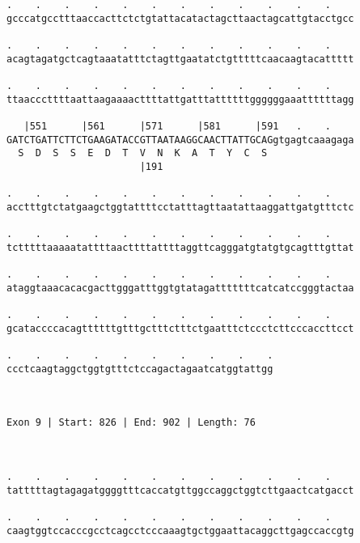\documentclass{article}
\begin{document}
\begin{Verbatim}
.    .    .    .    .    .    .    .    .    .    .    .    
gcccatgcctttaaccacttctctgtattacatactagcttaactagcattgtacctgcc
                                                            
.    .    .    .    .    .    .    .    .    .    .    .    
acagtagatgctcagtaaatatttctagttgaatatctgtttttcaacaagtacattttt
                                                            
.    .    .    .    .    .    .    .    .    .    .    .    
ttaacccttttaattaagaaaacttttattgatttattttttggggggaaattttttagg
                                                            
   |551      |561      |571      |581      |591   .    .    
GATCTGATTCTTCTGAAGATACCGTTAATAAGGCAACTTATTGCAGgtgagtcaaagaga
  S  D  S  S  E  D  T  V  N  K  A  T  Y  C  S               
                       |191                                 
  
.    .    .    .    .    .    .    .    .    .    .    .    
acctttgtctatgaagctggtattttcctatttagttaatattaaggattgatgtttctc
                                                            
.    .    .    .    .    .    .    .    .    .    .    .    
tctttttaaaaatattttaacttttattttaggttcagggatgtatgtgcagtttgttat
                                                            
.    .    .    .    .    .    .    .    .    .    .    .    
ataggtaaacacacgacttgggatttggtgtatagatttttttcatcatccgggtactaa
                                                            
.    .    .    .    .    .    .    .    .    .    .    .    
gcataccccacagttttttgtttgctttctttctgaatttctccctcttcccaccttcct
                                                            
.    .    .    .    .    .    .    .    .    .
ccctcaagtaggctggtgtttctccagactagaatcatggtattgg
                                              
                                              
 
Exon 9 | Start: 826 | End: 902 | Length: 76



.    .    .    .    .    .    .    .    .    .    .    .    
tatttttagtagagatggggtttcaccatgttggccaggctggtcttgaactcatgacct
                                                            
.    .    .    .    .    .    .    .    .    .    .    .    
caagtggtccacccgcctcagcctcccaaagtgctggaattacaggcttgagccaccgtg
                                                            

\end{Verbatim}
\end{document}
